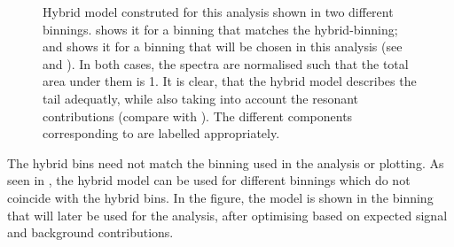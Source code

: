 \begin{figure}[htbp!]
    \caption{\label{fig:hybrid_bins_and_model} Hybrid model construted for this analysis 
    shown in two different binnings.
     shows it for a binning that matches the hybrid-binning; 
    and  shows it for a binning that will 
    be chosen in this analysis (see  and ).
    In both cases, the spectra are normalised such that the total area under them is 1.
    It is clear, that the hybrid model describes the tail adequatly, 
    while also taking into account the resonant contributions (compare with ).
    The different components corresponding to  are labelled appropriately.
    }
\end{figure}

The hybrid bins need not match the binning used in the analysis or plotting.
As seen in , the hybrid model can be used for different binnings which do not coincide with the hybrid bins.
In the figure, the model is shown in the binning that will later be used for the analysis, after optimising based on expected signal and background contributions.

